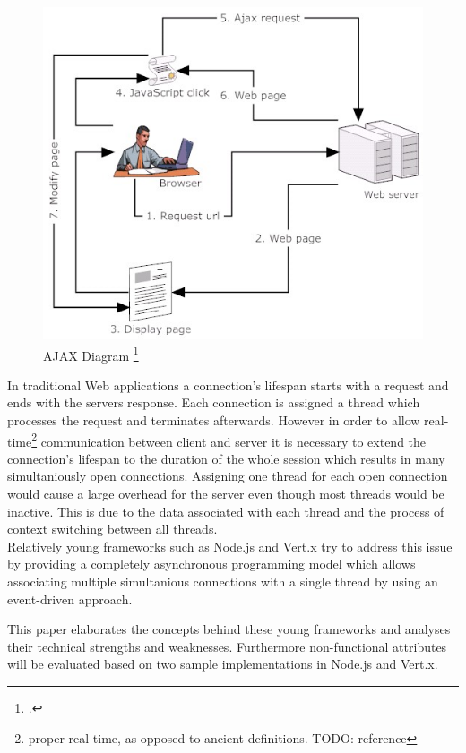\begin{figure}[hbtp]
\centering
\includegraphics[scale=0.5]{img/ajax-diagram}
\caption{AJAX Diagram \footcite{img_ajax}\label{img_ajax}}
\end{figure}





In traditional Web applications a connection's lifespan starts with a request and
ends with the servers response. Each connection is assigned a thread which
processes the request and terminates afterwards.
However in order to allow real-time\footnote{proper real time, as opposed to
ancient definitions. TODO: reference} communication between client and server it
is necessary to extend the connection's lifespan to the duration of the whole
session which results in many simultaniously open connections.
Assigning one thread for each open connection would cause a large overhead for
the server even though most threads would be inactive. This is due to the data
associated with each thread and the process of context switching between all
threads.\\
Relatively young frameworks such as Node.js and Vert.x try to address this issue 
by providing a completely asynchronous programming model which allows associating
multiple simultanious connections with a single thread by using an event-driven approach.

This paper elaborates the concepts behind these young frameworks and analyses their 
technical strengths and weaknesses. Furthermore non-functional attributes will be
evaluated based on two sample implementations in Node.js  and Vert.x.

